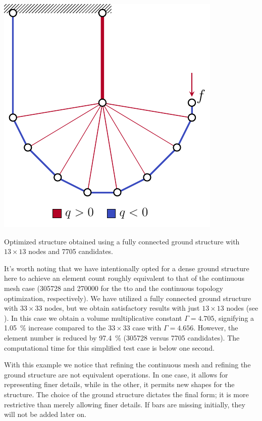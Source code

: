     \begin{marginfigure}
        \centering
        \includegraphics[width=0.8\linewidth]{figures/03_comparison_TO_TTO/12_tto_sol_13/L_tto_opt.pdf}
        \caption{Optimized structure obtained using a fully connected ground structure with $13 \times 13$ nodes and \num[group-separator={$\,$}]{7705} candidates.}
        \label{fig:03_L_tto_13}
    \end{marginfigure}
It's worth noting that we have intentionally opted for a dense ground structure here to achieve an element count roughly equivalent to that of the continuous mesh case (\num[group-separator={$\,$}]{305728} and \num[group-separator={$\,$}]{270000} for the \gls{tto} and the continuous topology optimization, respectively). We have utilized a fully connected ground structure with $33 \times 33$ nodes, but we obtain satisfactory results with just $13 \times 13$ nodes (see ). In this case we obtain a volume multiplicative constant $\Gamma=4.705$, signifying a \qty{1.05}{\percent} increase compared to the $33 \times 33$ case with $\Gamma=4.656$. However, the element number is reduced by \qty{97.4}{\percent} (\num[group-separator={$\,$}]{305728} versus \num[group-separator={$\,$}]{7705} candidates). The computational time for this simplified test case is below one second.

With this example we notice that refining the continuous mesh and refining the ground structure are not equivalent operations. In one case, it allows for representing finer details, while in the other, it permits new shapes for the structure. The choice of the ground structure dictates the final form; it is more restrictive than merely allowing finer details. If bars are missing initially, they will not be added later on.

